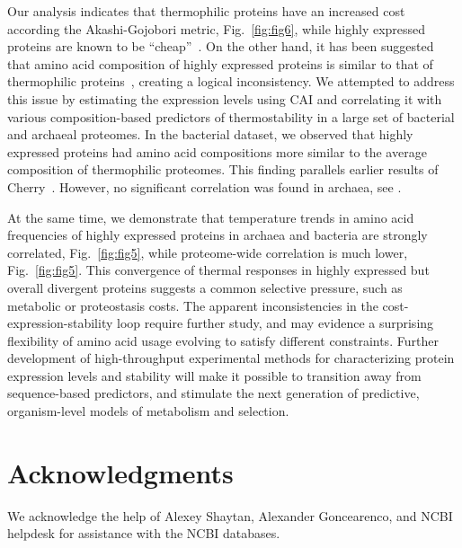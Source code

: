 \documentclass[10pt,letterpaper]{article}
\begin{document}
Our analysis indicates that thermophilic proteins have an increased cost according the Akashi-Gojobori metric, Fig.~\ref{fig:fig6}, while highly expressed proteins are known to be ``cheap''~\cite{Akashi2002Metabolic}. On the other hand, it has been suggested that amino acid composition of highly expressed proteins is similar to that of thermophilic proteins~\cite{Cherry2010Highly}, creating a logical inconsistency. We attempted to address this issue by estimating the expression levels using CAI and correlating it with various composition-based predictors of thermostability in a large set of bacterial and archaeal proteomes. In the bacterial dataset, we observed that highly expressed proteins had amino acid compositions more similar to the average composition of thermophilic proteomes. This finding parallels earlier results of Cherry~\cite{Cherry2010Highly}. However, no significant correlation was found in archaea, see . 

At the same time, we demonstrate that temperature trends in amino acid frequencies of highly expressed proteins in archaea and bacteria are strongly correlated, Fig.~\ref{fig:fig5}, while proteome-wide correlation is much lower, Fig.~\ref{fig:fig5}. This convergence of thermal responses in highly expressed but overall divergent proteins suggests a common selective pressure, such as metabolic or proteostasis costs. The apparent inconsistencies in the cost-expression-stability loop require further study, and may evidence a surprising flexibility of amino acid usage evolving to satisfy different constraints. Further development of high-throughput experimental methods for characterizing protein expression levels and stability will make it possible to transition away from sequence-based predictors, and stimulate the next generation of predictive, organism-level models of metabolism and selection.





\section*{Acknowledgments}

We acknowledge the help of Alexey Shaytan, Alexander Goncearenco, and NCBI helpdesk for assistance with the NCBI databases.
\end{document}
